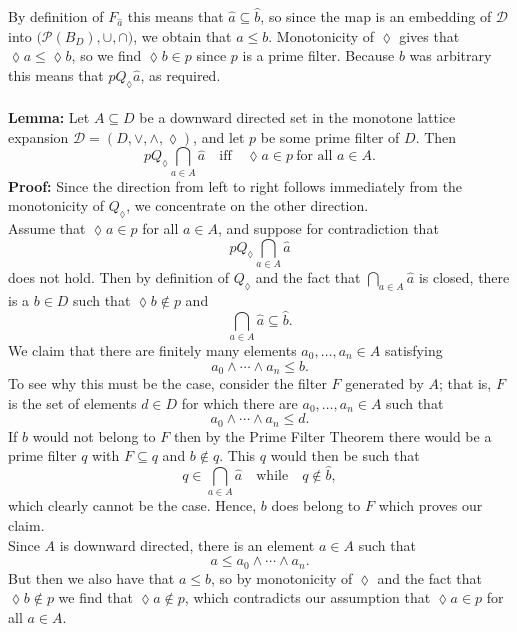 \documentclass[12pt]{article}
\begin{document}
By definition of $F_{\widehat{a}}$ this means that $\widehat{a} \subseteq \widehat{b}$,  
so since the map is an embedding of $\mathcal{D}$ into $\bigl( \mathcal{P}(B_{D}), \cup, \cap)$, we obtain that $a \leq b$.  
Monotonicity of $\lozenge$ gives that $\lozenge a \leq \lozenge b$,  
so we find $\lozenge b \in p$ since $p$ is a prime filter.  
Because $b$ was arbitrary this means that $p Q_{\lozenge} \widehat{a}$, as required. \\ \\
\textbf{Lemma:}  
Let $A \subseteq D$ be a downward directed set in the monotone lattice expansion 
$\mathcal{D} = (D, \vee, \wedge, \lozenge)$, and let $p$ be some prime filter of $D$.  
Then
\[
p Q_{\lozenge} \bigcap_{a \in A} \widehat{a} 
\quad \text{iff} \quad 
\lozenge a \in p \ \text{for all } a \in A.
\]
\textbf{Proof:}  
Since the direction from left to right follows immediately from the monotonicity of $Q_{\lozenge}$, 
we concentrate on the other direction.\\
Assume that $\lozenge a \in p$ for all $a \in A$, and suppose for contradiction that 
\[
p Q_{\lozenge} \bigcap_{a \in A} \widehat{a}
\]
does not hold.  
Then by definition of $Q_{\lozenge}$ and the fact that $\bigcap_{a \in A} \widehat{a}$ is closed, 
there is a $b \in D$ such that $\lozenge b \notin p$ and 
\[
\bigcap_{a \in A} \widehat{a} \subseteq \widehat{b}.
\]
We claim that there are finitely many elements $a_{0}, \dots, a_{n} \in A$ satisfying
\[
a_{0} \wedge \cdots \wedge a_{n} \leq b.
\]
To see why this must be the case, consider the filter $F$ generated by $A$; 
that is, $F$ is the set of elements $d \in D$ for which there are $a_{0}, \dots, a_{n} \in A$ such that 
\[
a_{0} \wedge \cdots \wedge a_{n} \leq d.
\]
If $b$ would not belong to $F$ then by the Prime Filter Theorem there would be a prime filter $q$ with $F \subseteq q$ and $b \notin q$.  
This $q$ would then be such that 
\[
q \in \bigcap_{a \in A} \widehat{a} \quad \text{while} \quad q \notin \widehat{b},
\]
which clearly cannot be the case.  
Hence, $b$ does belong to $F$ which proves our claim.\\
Since $A$ is downward directed, there is an element $a \in A$ such that 
\[
a \leq a_{0} \wedge \cdots \wedge a_{n}.
\]
But then we also have that $a \leq b$, so by monotonicity of $\lozenge$ and the fact that $\lozenge b \notin p$ we find that $\lozenge a \notin p$, which contradicts our assumption that $\lozenge a \in p$ for all $a \in A$. 
\end{document}
